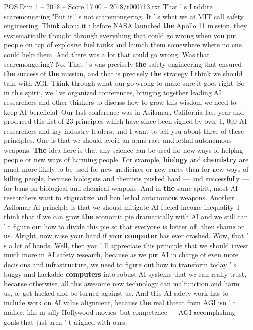 \begin{textsample}{POS Dim 1 – 2018 – Score 17.00 – 2018/t000713.txt}
That ' s Luddite scaremongering."But it ' s not scaremongering.
It ' s what we at MIT call safety engineering.
Think about it : before NASA launched \textbf{the} Apollo 11 mission, they systematically thought through everything that could go wrong when you put people on top of explosive fuel tanks and launch them somewhere where no one could help them.
And there was a lot that could go wrong.
Was that scaremongering?
No.
That ' s was precisely \textbf{the} safety engineering that ensured \textbf{the} success of \textbf{the} mission, and that is precisely \textbf{the} strategy I think we should take with AGI.
Think through what can go wrong to make sure it goes right.
So in this spirit, we ' ve organized conferences, bringing together leading AI researchers and other thinkers to discuss how to grow this wisdom we need to keep AI beneficial.
Our last conference was in Asilomar, California last year and produced this list of 23 principles which have since been signed by over 1, 000 AI researchers and key industry leaders, and I want to tell you about three of these principles.
One is that we should avoid an arms race and lethal autonomous weapons. \textbf{The} idea here is that any science can be used for new ways of helping people or new ways of harming people.
For example, \textbf{biology} and \textbf{chemistry} are much more likely to be used for new medicines or new cures than for new ways of killing people, because biologists and chemists pushed hard — and successfully — for bans on biological and chemical weapons.
And in \textbf{the} same spirit, most AI researchers want to stigmatize and ban lethal autonomous weapons.
Another Asilomar AI principle is that we should mitigate AI-fueled income inequality.
I think that if we can grow \textbf{the} economic pie dramatically with AI and we still can ' t figure out how to divide this pie so that everyone is better off, then shame on us.
Alright, now raise your hand if your \textbf{computer} has ever crashed.
Wow, that ' s a lot of hands.
Well, then you ' ll appreciate this principle that we should invest much more in AI safety research, because as we put AI in charge of even more decisions and infrastructure, we need to figure out how to transform today ' s buggy and hackable \textbf{computers} into robust AI systems that we can really trust, because otherwise, all this awesome new technology can malfunction and harm us, or get hacked and be turned against us.
And this AI safety work has to include work on AI value alignment, because \textbf{the} real threat from AGI isn ' t malice, like in silly Hollywood movies, but competence — AGI accomplishing goals that just aren ' t aligned with ours.

\end{textsample}
